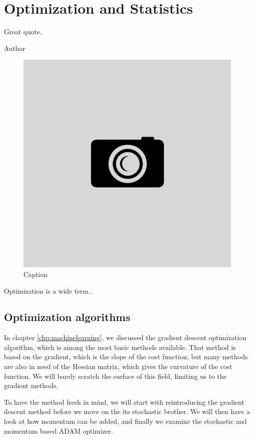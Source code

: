 \chapter{Optimization and Statistics} \label{chp:optimization}
\epigraph{Great quote.}{Author}
\begin{figure}[H]
	\centering
	\includegraphics[scale=0.4]{Images/example.png}
	\caption{Caption}
\end{figure}

Optimization is a wide term..

\newpage
\section{Optimization algorithms}
In chapter \ref{chp:machinelearning}, we discussed the gradient descent optimization algorithm, which is among the most basic methods available. That method is based on the gradient, which is the slope of the cost function, but many methods are also in need of the Hessian matrix, which gives the curvature of the cost function. We will barely scratch the surface of this field, limiting us to the gradient methods. 

To have the method fresh in mind, we will start with reintroducing the gradient descent method before we move on the its stochastic brother. We will then have a look at how momentum can be added, and finally we examine the stochastic and momentum based ADAM optimizer. 

